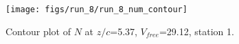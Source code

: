 \begin{figure}[H]
\centering
\texttt{[image: figs/run\_8/run\_8\_num\_contour]}
\caption{Contour plot of $N$ at $z/c$=5.37, $V_{free}$=29.12, station 1.}
\label{fig:run_8_num_contour}
\end{figure}


